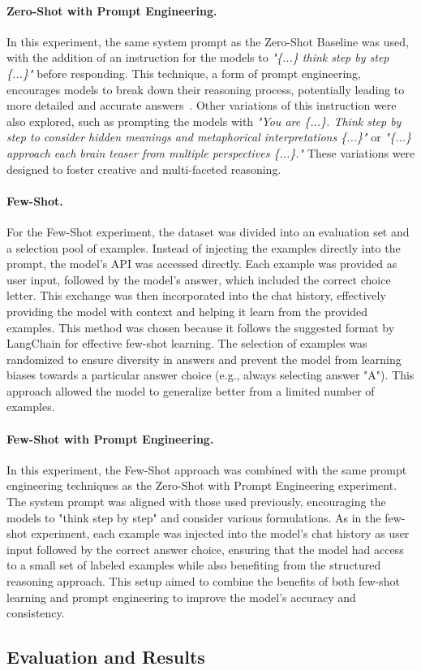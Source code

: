 \paragraph{Zero-Shot with Prompt Engineering.}
In this experiment, the same system prompt as the Zero-Shot Baseline was used, with the addition of an instruction for the models to \textit{"\{...\} think step by step \{...\}"} before responding. This technique, a form of prompt engineering, encourages models to break down their reasoning process, potentially leading to more detailed and accurate answers~\cite{weiChainofThoughtPromptingElicits2023}. Other variations of this instruction were also explored, such as prompting the models with \textit{"You are \{...\}. Think step by step to consider hidden meanings and metaphorical interpretations \{...\}"} or \textit{"\{...\} approach each brain teaser from multiple perspectives \{...\}."} These variations were designed to foster creative and multi-faceted reasoning.

\paragraph{Few-Shot.}
For the Few-Shot experiment, the dataset was divided into an evaluation set and a selection pool of examples. Instead of injecting the examples directly into the prompt, the model's API was accessed directly. Each example was provided as user input, followed by the model's answer, which included the correct choice letter. This exchange was then incorporated into the chat history, effectively providing the model with context and helping it learn from the provided examples. This method was chosen because it follows the suggested format by LangChain for effective few-shot learning. The selection of examples was randomized to ensure diversity in answers and prevent the model from learning biases towards a particular answer choice (e.g., always selecting answer "A"). This approach allowed the model to generalize better from a limited number of examples.

\paragraph{Few-Shot with Prompt Engineering.}
In this experiment, the Few-Shot approach was combined with the same prompt engineering techniques as the Zero-Shot with Prompt Engineering experiment. The system prompt was aligned with those used previously, encouraging the models to "think step by step" and consider various formulations. As in the few-shot experiment, each example was injected into the model's chat history as user input followed by the correct answer choice, ensuring that the model had access to a small set of labeled examples while also benefiting from the structured reasoning approach. This setup aimed to combine the benefits of both few-shot learning and prompt engineering to improve the model’s accuracy and consistency.

\subsection{Evaluation and Results}
